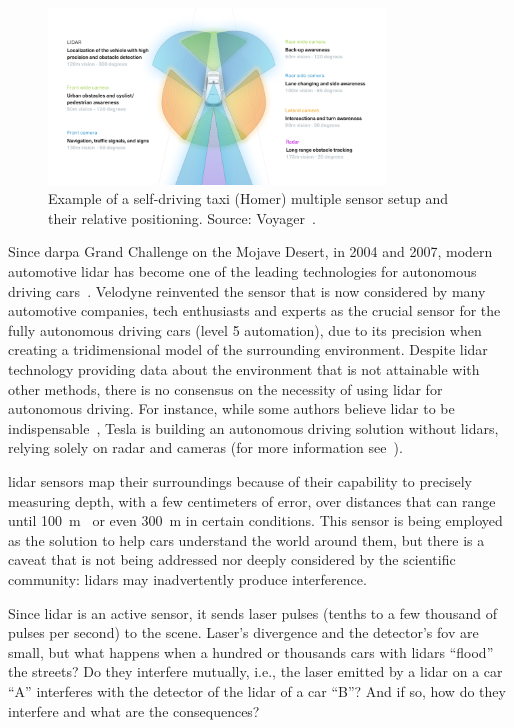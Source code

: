 \begin{figure}
	\centering
	\includegraphics[width=0.8\textwidth]{img/sensor_fusion/homer_setup.png}
	\caption[Example of a multiple sensor setup on an autonomous car.]{Example of a self-driving taxi (Homer) multiple sensor setup and their relative positioning. Source: Voyager~\cite{Cameron}.}
	\label{fig:introduction:homer-setup}
\end{figure}

Since \ac{darpa} Grand Challenge on the Mojave Desert, in 2004 and 2007, modern automotive \ac{lidar} has become one of the leading technologies for autonomous driving cars~\cite{Bezemek2017}. Velodyne reinvented the sensor that is now considered by many automotive companies, tech enthusiasts and experts as the crucial sensor for the fully autonomous driving cars (level 5 automation), due to its precision when creating a tridimensional  model of the surrounding environment. Despite \ac{lidar} technology providing data about the environment that is not attainable with other methods, there is no consensus on the necessity of using \ac{lidar} for autonomous driving. For instance, while some authors believe \ac{lidar} to be indispensable~\cite{Bimbraw2015, Hecht2018, Sullivan2016}, Tesla is building an autonomous driving solution without \acp{lidar}, relying solely on \ac{radar} and cameras (for more information see~\cite{Bimbraw2015, Hecht2018}).


\ac{lidar} sensors map their surroundings because of their capability to precisely measuring depth, with a few centimeters of error, over distances that can range until \SI{100}{\meter}~\cite{VLP16, Sullivan2016} or even \SI{300}{\meter} in certain conditions. This sensor is being employed as the solution to help cars understand the world around them, but there is a caveat that is not being addressed nor deeply considered by the scientific community: \acp{lidar} may inadvertently produce interference.

Since \ac{lidar} is an active sensor, it sends laser pulses (tenths to a few thousand of pulses per second) to the scene. Laser's divergence and the detector's \ac{fov} are small, but what happens when a hundred or thousands cars with \acp{lidar} ``flood'' the streets? Do they interfere mutually, i.e., the laser emitted by a \ac{lidar} on a car ``A'' interferes with the detector of the \ac{lidar} of a car ``B''? And if so, how do they interfere and what are the consequences? 

